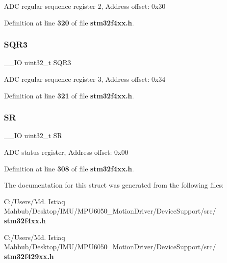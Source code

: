 A\+DC regular sequence register 2, Address offset\+: 0x30 

Definition at line \textbf{ 320} of file \textbf{ stm32f4xx.\+h}.

\mbox{\label{structADC__TypeDef_a97e40d9928fa25a5628d6442f0aa6c0f}} 
\subsubsection{S\+Q\+R3}
{\footnotesize\ttfamily \+\_\+\+\_\+\+IO uint32\+\_\+t S\+Q\+R3}

A\+DC regular sequence register 3, Address offset\+: 0x34 

Definition at line \textbf{ 321} of file \textbf{ stm32f4xx.\+h}.

\mbox{\label{structADC__TypeDef_af6aca2bbd40c0fb6df7c3aebe224a360}} 
\subsubsection{SR}
{\footnotesize\ttfamily \+\_\+\+\_\+\+IO uint32\+\_\+t SR}

A\+DC status register, Address offset\+: 0x00 

Definition at line \textbf{ 308} of file \textbf{ stm32f4xx.\+h}.



The documentation for this struct was generated from the following files\+:\begin{DoxyCompactItemize}
\item 
C\+:/\+Users/\+Md. Istiaq Mahbub/\+Desktop/\+I\+M\+U/\+M\+P\+U6050\+\_\+\+Motion\+Driver/\+Device\+Support/src/\textbf{ stm32f4xx.\+h}\item 
C\+:/\+Users/\+Md. Istiaq Mahbub/\+Desktop/\+I\+M\+U/\+M\+P\+U6050\+\_\+\+Motion\+Driver/\+Device\+Support/src/\textbf{ stm32f429xx.\+h}\end{DoxyCompactItemize}
